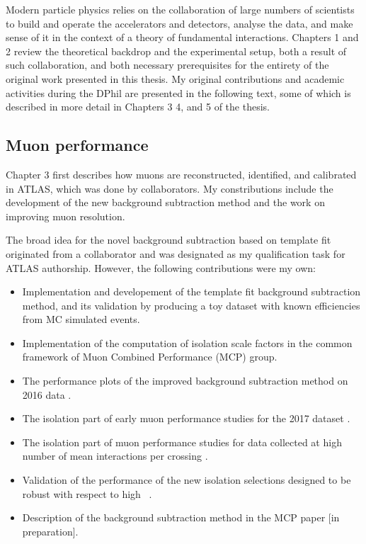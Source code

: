 \begin{originality}

Modern particle physics relies on the collaboration of large
numbers of scientists to build and operate the accelerators and
detectors, analyse the data, and make sense of it in the
context of a theory of fundamental interactions. Chapters 1
and 2 review the theoretical backdrop and the experimental
setup, both a result of such collaboration, and both necessary
prerequisites for the entirety of the original work presented
in this thesis. My original contributions and academic
activities during the DPhil are presented in the following
text, some of which is described in more detail in Chapters 3
4, and 5 of the thesis.

\subsection*{Muon performance}

Chapter 3 first describes how muons are reconstructed,
identified, and calibrated in ATLAS, which was done by
collaborators. My constributions include the development
of the new background subtraction method and the work on
improving muon resolution.

The broad idea for the novel background subtraction
based on template fit originated from a collaborator and 
was designated as my qualification task for ATLAS authorship.
However, the following contributions were my own:
\begin{itemize}
\item Implementation and developement of the template fit background
subtraction method, and its validation by producing a toy
dataset with known efficiencies from MC simulated events.
\item Implementation of the computation of isolation scale factors in
the common framework of Muon Combined Performance (MCP) group.
\item The performance plots of the improved background
subtraction method on 2016 data \cite{Zgubic:2293041}.
\item The isolation part of early muon performance
studies for the 2017 dataset \cite{Bellomo:2282672}.
\item The isolation part of muon performance
studies for data collected at high number of mean interactions
per crossing \cite{Kohler:2293040}.
\item Validation of the performance of the new isolation
selections designed to be robust with respect to high
\pileup~\cite{Zgubic:2320874}.
\item Description of the background subtraction method in
the MCP paper [in preparation].
\end{itemize}


\end{originality}
